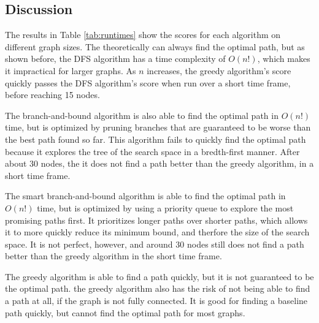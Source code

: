 \documentclass[12pt]{article}
\begin{document}
\subsection{Discussion}
The results in Table \ref{tab:runtimes} show the scores for each algorithm on different
graph sizes. The theoretically can always find the optimal path, but as shown before, the
DFS algorithm has a time complexity of $O(n!)$, which makes it impractical for larger graphs.
As $n$ increases, the greedy algorithm's score quickly passes the DFS algorithm's score when
run over a short time frame, before reaching 15 nodes.

The branch-and-bound algorithm is also able to find the optimal path in $O(n!)$ time, but
is optimized by pruning branches that are guaranteed to be worse than the best path found so far.
This algorithm fails to quickly find the optimal path because it explores the tree of the search
space in a bredth-first manner. After about 30 nodes, the it does not find a path better than the 
greedy algorithm, in a short time frame.

The smart branch-and-bound algorithm is able to find the optimal path in $O(n!)$ time, but
is optimized by using a priority queue to explore the most promising paths first. It prioritizes
longer paths over shorter paths, which allows it to more quickly reduce its minimum bound, and therfore
the size of the search space. It is not perfect, however, and around 30 nodes still does not find
a path better than the greedy algorithm in the short time frame.

The greedy algorithm is able to find a path quickly, but it is not guaranteed to be the optimal path.
the greedy algorithm also has the risk of not being able to find a path at all, if the
graph is not fully connected. It is good for finding a baseline path quickly, but cannot find the
optimal path for most graphs.
\end{document}
